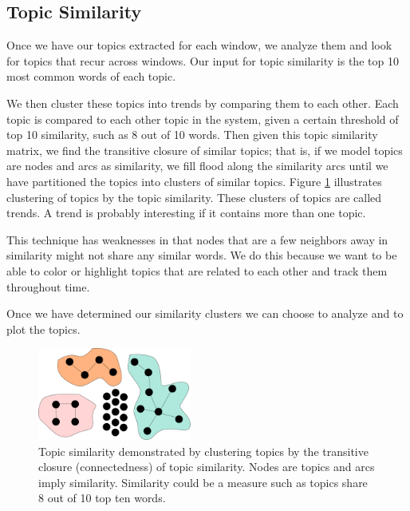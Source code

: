 \documentclass[times, 10pt,twocolumn]{article}
\newcommand{\shrinkit}{\vspace*{-.3em}}
\begin{document}


\shrinkit
\subsection{Topic Similarity}
\shrinkit


Once we have our topics extracted for each window, we analyze them and
look for topics that recur across windows. Our input for topic
similarity is the top 10 most common words of each topic.

We then cluster these topics into trends by comparing them to each
other.  Each topic is compared to each other topic in the system,
given a certain threshold of top 10 similarity, such as 8 out of 10
words. Then given this topic similarity matrix, we find the transitive
closure of similar topics; that is, if we model topics are nodes and
arcs as similarity, we fill flood along the similarity arcs until we
have partitioned the topics into clusters of similar topics. Figure
\ref{fig:closure} illustrates clustering of topics by the
topic similarity. These clusters of topics are called trends. A trend
is probably interesting if it contains more than one topic.

This technique has weaknesses in that nodes that are a few neighbors
away in similarity might not share any similar words.  We do this
because we want to be able to color or highlight topics that are
related to each other and track them throughout time.

Once we have determined our similarity clusters we can choose to
analyze and to plot the topics.

\begin{figure}
  \centering
  \includegraphics[width=0.45\textwidth]{transitiveclosure}
  \caption{Topic similarity demonstrated by clustering topics by the transitive closure (connectedness)
    of topic similarity. Nodes are topics and
    arcs imply similarity. Similarity could be a measure such as
    topics share 8 out of 10 top ten words.}
\label{fig:closure}
\end{figure}
\end{document}
